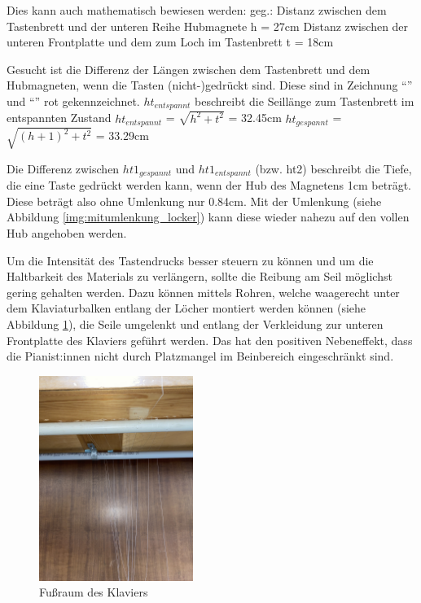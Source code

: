 \newpage
Dies kann auch mathematisch bewiesen werden:
\newline geg.:
\newline Distanz zwischen dem Tastenbrett und der unteren Reihe Hubmagnete h = 27cm
\newline Distanz zwischen der unteren Frontplatte und dem zum Loch im Tastenbrett t = 18cm

Gesucht ist die Differenz der Längen zwischen dem Tastenbrett und dem Hubmagneten, wenn die Tasten (nicht-)gedrückt sind.
Diese sind in Zeichnung \enquote{} und \enquote{} rot gekennzeichnet.
\newline $ht_{entspannt}$ beschreibt die Seillänge zum Tastenbrett im entspannten Zustand
\newline $ht_{entspannt}$ = $\sqrt {h^{2} + t^{2}}$ = 32.45cm
\newline $ht_{gespannt}$ = $\sqrt {(h + 1)^{2} + t^{2}}$ = 33.29cm


Die Differenz zwischen $ht1_{gespannt}$ und $ht1_{entspannt}$ (bzw. ht2) beschreibt die Tiefe,
die eine Taste gedrückt werden kann, wenn der Hub des Magnetens 1cm beträgt.
\newline Diese beträgt also ohne Umlenkung nur 0.84cm.
Mit der Umlenkung (siehe Abbildung \ref{img:mitumlenkung_locker}) kann diese wieder nahezu auf den vollen Hub angehoben werden.

Um die Intensität des Tastendrucks besser steuern zu können und um die Haltbarkeit des Materials zu verlängern,
sollte die Reibung am Seil möglichst gering gehalten werden.
Dazu können mittels Rohren, welche waagerecht unter dem Klaviaturbalken entlang der Löcher montiert werden können (siehe Abbildung \ref{fig:fussraum}), die Seile umgelenkt und
entlang der Verkleidung zur unteren Frontplatte des Klaviers geführt werden.
Das hat den positiven Nebeneffekt, dass die Pianist:innen nicht durch Platzmangel im Beinbereich eingeschränkt sind.


\begin{figure}[htbp]
    \centering
    \includegraphics[width=5cm,angle=-90]{img/Fussraum.jpg}
    \caption{Fußraum des Klaviers}
    \label{fig:fussraum}
\end{figure}


